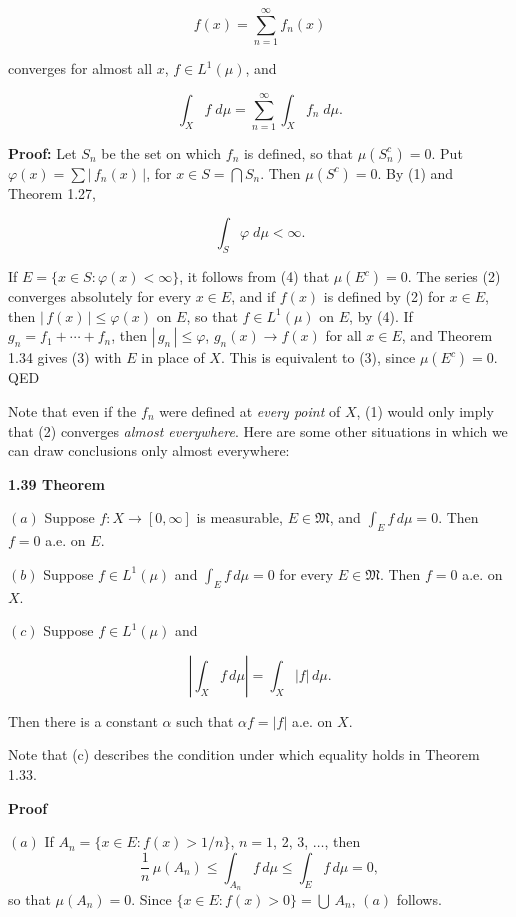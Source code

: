 \documentclass[11pt]{article}
\begin{document}
\[
f(x)=\sum\limits_{n=1}^{\infty}f_{n}(x)\tag{2}
\]

converges for almost all \(x\), \(f\in L^{1}(\mu)\), and

\[
\int_{X}f\;d\mu=\sum\limits_{n=1}^{\infty}\int_{X}f_{n}\;d\mu.\tag{3}
\]

\textbf{\textbf{Proof:}} Let \(S_{n}\) be the set on which \(f_{n}\) is defined, so that \(\mu(S_{n}^{c})=0\). Put \(\varphi(x)=\sum|\,f_{n}(x)\,|\), for \(x\in S=\bigcap S_{n}\). Then \(\mu(S^{c})=0\). By (1) and Theorem 1.27,

\[
\int_{S}\varphi\;d\mu<\infty.\tag{4}
\]

If \(E=\{x\in S\colon\varphi(x)<\infty\}\), it follows from (4) that \(\mu(E^{c})=0\). The series (2) converges absolutely for every \(x\in E\), and if \(f(x)\) is defined by (2) for \(x\in E\), then \(|\,f(x)\,|\leq\varphi(x)\) on \(E\), so that \(f\in L^{1}(\mu)\) on \(E\), by (4). If \(g_{n}=f_{1}+\cdots+f_{n}\), then \(|\,g_{n}\,|\leq\varphi\), \(g_{n}(x)\to f(x)\) for all \(x\in E\), and Theorem 1.34 gives (3) with \(E\) in place of \(X\). This is equivalent to (3), since \(\mu(E^{c})=0\). QED

Note that even if the \(f_{n}\) were defined at \emph{every point} of \(X\), (1) would only imply that (2) converges \emph{almost everywhere}. Here are some other situations in which we can draw conclusions only almost everywhere:

\label{org5f06a84}
\textbf{\textbf{1.39 Theorem}}

\((a)\) Suppose \(f \colon X \to [0, \infty]\) is measurable, \(E \in \mathfrak{M}\), and \(\int_{E} f \, d\mu = 0\). Then \(f = 0\) a.e. on \(E\).

\((b)\) Suppose \(f \in L^{1}(\mu)\) and \(\int_{E} f \, d\mu = 0\) for every \(E \in \mathfrak{M}\). Then \(f = 0\) a.e. on \(X\).

\((c)\) Suppose \(f \in L^{1}(\mu)\) and

\[
\left| \int_{X} f \, d\mu \right| = \int_{X} |f| \, d\mu.
\]

Then there is a constant \(\alpha\) such that \(\alpha f = |f|\) a.e. on \(X\).

Note that (c) describes the condition under which equality holds in Theorem 1.33.

\textbf{\textbf{Proof}}

\((a)\) If \(A_{n}=\{x\in E\colon f(x)>1/n\}\), \(n=1\), 2, 3, \(\ldots\), then
  \[
  \frac{1}{n}\,\mu(A_{n})\leq\int_{A_{n}}f\,d\mu\leq\int_{E}f\,d\mu=0,
  \]
  so that \(\mu(A_{n})=0\). Since \(\{x\in E\colon f(x)>0\}=\bigcup\,A_{n}\), \((a)\) follows.
\end{document}
